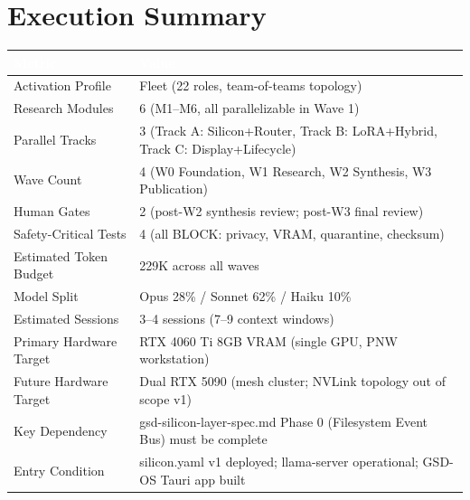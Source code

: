 \documentclass[11pt,letterpaper]{article}
\newcommand{\tableheader}[1]{\textbf{\sffamily\textcolor{white}{#1}}}
\begin{document}
\section{Execution Summary}

\begin{center}
\begin{tabularx}{\textwidth}{L{4cm}X}
\toprule
{}
\tableheader{Metric} & \tableheader{Value} \\
\midrule
Activation Profile & Fleet (22 roles, team-of-teams topology) \\
Research Modules & 6 (M1--M6, all parallelizable in Wave 1) \\
Parallel Tracks & 3 (Track A: Silicon+Router, Track B: LoRA+Hybrid, Track C: Display+Lifecycle) \\
Wave Count & 4 (W0 Foundation, W1 Research, W2 Synthesis, W3 Publication) \\
Human Gates & 2 (post-W2 synthesis review; post-W3 final review) \\
Safety-Critical Tests & 4 (all BLOCK: privacy, VRAM, quarantine, checksum) \\
Estimated Token Budget & 229K across all waves \\
Model Split & Opus 28\% / Sonnet 62\% / Haiku 10\% \\
Estimated Sessions & 3--4 sessions (7--9 context windows) \\
Primary Hardware Target & RTX 4060 Ti 8GB VRAM (single GPU, PNW workstation) \\
Future Hardware Target & Dual RTX 5090 (mesh cluster; NVLink topology out of scope v1) \\
Key Dependency & gsd-silicon-layer-spec.md Phase 0 (Filesystem Event Bus) must be complete \\
Entry Condition & silicon.yaml v1 deployed; llama-server operational; GSD-OS Tauri app built \\
\bottomrule
\end{tabularx}
\end{center}

\vspace{2em}
\end{document}
